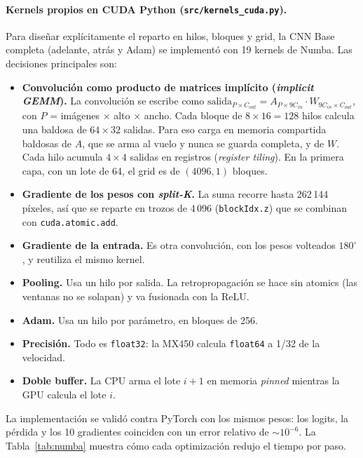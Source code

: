 \documentclass[11pt,letterpaper]{article}
\newcommand{\cod}[1]{\texttt{#1}}
\begin{document}
\paragraph{Kernels propios en CUDA Python (\cod{src/kernels\_cuda.py}).}
Para diseñar explícitamente el reparto en hilos, bloques y grid, la CNN Base completa (adelante, atrás y Adam) se implementó con 19 kernels de Numba. Las decisiones principales son:
\begin{itemize}
  \item \textbf{Convolución como producto de matrices implícito (\textit{implicit GEMM}).} La convolución se escribe como $\text{salida}_{P\times C_{out}} = A_{P\times 9C_{in}}\cdot W_{9C_{in}\times C_{out}}$, con $P$ = imágenes $\times$ alto $\times$ ancho. Cada bloque de $8\times16=128$ hilos calcula una baldosa de $64\times32$ salidas. Para eso carga en memoria compartida baldosas de $A$, que se arma al vuelo y nunca se guarda completa, y de $W$. Cada hilo acumula $4\times4$ salidas en registros (\textit{register tiling}). En la primera capa, con un lote de 64, el grid es de $(4096, 1)$ bloques.
  \item \textbf{Gradiente de los pesos con \textit{split-K}.} La suma recorre hasta 262\,144 píxeles, así que se reparte en trozos de 4\,096 (\cod{blockIdx.z}) que se combinan con \cod{cuda.atomic.add}.
  \item \textbf{Gradiente de la entrada.} Es otra convolución, con los pesos volteados $180^\circ$, y reutiliza el mismo kernel.
  \item \textbf{Pooling.} Usa un hilo por salida. La retropropagación se hace sin atomics (las ventanas no se solapan) y va fusionada con la ReLU.
  \item \textbf{Adam.} Usa un hilo por parámetro, en bloques de 256.
  \item \textbf{Precisión.} Todo es \cod{float32}: la MX450 calcula \cod{float64} a 1/32 de la velocidad.
  \item \textbf{Doble buffer.} La CPU arma el lote $i+1$ en memoria \textit{pinned} mientras la GPU calcula el lote $i$.
\end{itemize}
La implementación se validó contra PyTorch con los mismos pesos: los logits, la pérdida y los 10 gradientes coinciden con un error relativo de $\sim10^{-6}$. La Tabla~\ref{tab:numba} muestra cómo cada optimización redujo el tiempo por paso.

\begin{table}[H]\centering\small
\caption{Versiones de los kernels de convolución en Numba: un paso completo de entrenamiento con un lote de 64. Se midió después del entrenamiento completo, con la GPU caliente y su reloj a $\sim$450\,MHz: importa la mejora entre versiones más que el tiempo absoluto.}
\label{tab:numba}
\TablaNumbaVersiones
\end{table}
\end{document}
